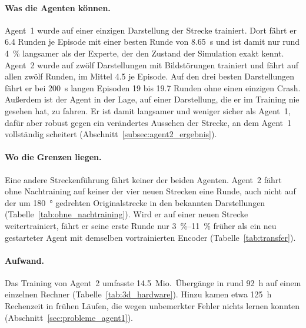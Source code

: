 \paragraph{Was die Agenten können.}
Agent~1 wurde auf einer einzigen Darstellung der Strecke trainiert. Dort fährt er \num{6.4} Runden je Episode mit einer besten Runde von \SI{8.65}{\second} und ist damit nur rund \SI{4}{\percent} langsamer als der Experte, der den Zustand der Simulation exakt kennt. Agent~2 wurde auf zwölf Darstellungen mit Bildstörungen trainiert und fährt auf allen zwölf Runden, im Mittel \num{4.5} je Episode. Auf den drei besten Darstellungen fährt er bei \SI{200}{\second} langen Episoden \num{19} bis \num{19.7} Runden ohne einen einzigen Crash. Außerdem ist der Agent in der Lage, auf einer Darstellung, die er im Training nie gesehen hat, zu fahren. Er ist damit langsamer und weniger sicher als Agent~1, dafür aber robust gegen ein verändertes Aussehen der Strecke, an dem Agent~1 vollständig scheitert (Abschnitt~\ref{subsec:agent2_ergebnis}).

\paragraph{Wo die Grenzen liegen.}
Eine andere Streckenführung fährt keiner der beiden Agenten. Agent~2 fährt ohne Nachtraining auf keiner der vier neuen Strecken eine Runde, auch nicht auf der um \SI{180}{\degree} gedrehten Originalstrecke in den bekannten Darstellungen (Tabelle~\ref{tab:ohne_nachtraining}). Wird er auf einer neuen Strecke weitertrainiert, fährt er seine erste Runde nur \SIrange{3}{11}{\percent} früher als ein neu gestarteter Agent mit demselben vortrainierten Encoder (Tabelle~\ref{tab:transfer}).

\paragraph{Aufwand.}
Das Training von Agent~2 umfasste \num{14.5}~Mio.\ Übergänge in rund \SI{92}{\hour} auf einem einzelnen Rechner (Tabelle~\ref{tab:3d_hardware}). Hinzu kamen etwa \SI{125}{\hour} Rechenzeit in frühen Läufen, die wegen unbemerkter Fehler nichts lernen konnten (Abschnitt~\ref{sec:probleme_agent1}).
